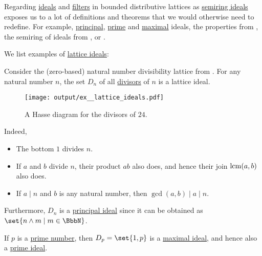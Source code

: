 \begin{remark}\label{rem:lattice_ideals_as_semiring_ideals}
  Regarding \hyperref[thm:lattice_ideals]{ideals} and \hyperref[thm:lattice_filters]{filters} in bounded distributive lattices as \hyperref[def:semiring_ideal]{semiring ideals} exposes us to a lot of definitions and theorems that we would otherwise need to redefine. For example, \hyperref[def:semiring_ideal/principal]{principal}, \hyperref[def:semiring_ideal/prime]{prime} and \hyperref[def:semiring_ideal/maximal]{maximal} ideals, the properties from , the semiring of ideals from , or .
\end{remark}

\begin{example}\label{ex:lattice_ideals}
  We list examples of \hyperref[thm:lattice_ideals]{lattice ideals}:
  \begin{thmenum}
     Consider the (zero-based) natural number divisibility lattice from . For any natural number \( n \), the set \( D_n \) of all \hyperref[def:divisibility]{divisors} of \( n \) is a lattice ideal.

    \begin{figure}
      \centering
      \texttt{[image: output/ex\_\_lattice\_ideals.pdf]}
      \caption{A Hasse diagram for the divisors of \( 24 \).}
      \label{fig:ex:lattice_ideals/lattice}
    \end{figure}

    Indeed,
    \begin{itemize}
      \item The bottom \( 1 \) divides \( n \).
      \item If \( a \) and \( b \) divide \( n \), their product \( ab \) also does, and hence their join \( \operatorname{lcm}(a, b) \) also does.
      \item If \( a \mid n \) and \( b \) is any natural number, then \( \gcd(a, b) \mid a \mid n \).
    \end{itemize}

    Furthermore, \( D_n \) is a \hyperref[def:semiring_ideal]{principal ideal} since it can be obtained as \( \set{ n \wedge m \mid m \in \BbbN } \).

    If \( p \) is a \hyperref[def:prime_number]{prime number}, then \( D_p = \set{ 1, p } \) is a \hyperref[def:semiring_ideal/maximal]{maximal ideal}, and hence also a \hyperref[def:semiring_ideal/prime]{prime ideal}.


\end{thmenum}
\end{example}
